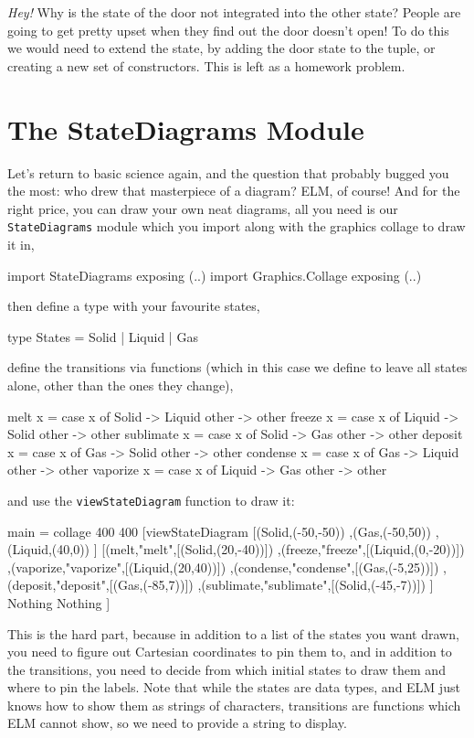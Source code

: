 \documentclass[12pt]{amsbook}
\begin{document}
\medskip
\emph{Hey!} Why is the state of the door not integrated into the other state?
People are going to get pretty upset when they find out the door doesn't open!
To do this we would need to extend the state, by adding the door state to the 
tuple, or creating a new set of constructors.
This is left as a homework problem.

\section{The StateDiagrams Module}

Let's return to basic science again, and the question that probably bugged you the most:  who drew that masterpiece of a diagram?
ELM, of course!
And for the right price, you can draw your own neat diagrams, all you need is our \texttt{StateDiagrams} module which you import along with the graphics collage to draw it in,
\begin{code}
import StateDiagrams exposing (..)
import Graphics.Collage exposing (..)
\end{code}
then define a type with your favourite states,
\begin{code}
type States = Solid | Liquid | Gas
\end{code}
define the transitions via functions
(which in this case we define to leave all states alone, other than the ones they change),
\begin{code}
melt x = case x of
           Solid -> Liquid
           other -> other
freeze x = case x of
             Liquid -> Solid
             other  -> other
sublimate x = case x of
               Solid -> Gas
               other -> other
deposit x = case x of
              Gas   -> Solid
              other -> other
condense x = case x of
               Gas   -> Liquid
               other -> other
vaporize x = case x of
               Liquid -> Gas
               other  -> other
\end{code}
and use the \texttt{viewStateDiagram}
function to draw it:
\begin{code}
main = collage 400 400 
         [viewStateDiagram [(Solid,(-50,-50))
                           ,(Gas,(-50,50))
                           ,(Liquid,(40,0))
                           ]
                           [(melt,"melt",[(Solid,(20,-40))])
                           ,(freeze,"freeze",[(Liquid,(0,-20))])
                           ,(vaporize,"vaporize",[(Liquid,(20,40))])
                           ,(condense,"condense",[(Gas,(-5,25))])
                           ,(deposit,"deposit",[(Gas,(-85,7))])
                           ,(sublimate,"sublimate",[(Solid,(-45,-7))])
                           ]
                           Nothing
                           Nothing
         ]
\end{code}
This is the hard part, because in addition to
a list of the states you want drawn, you need to figure out Cartesian coordinates to pin them to,
and in addition to the transitions,
you need to decide from which initial states to draw 
them and where to pin the labels.
Note that while the states are data types, 
and ELM just knows how to show them as strings of characters,
transitions are functions which ELM cannot show,
so we need to provide a string to display.
\end{document}
